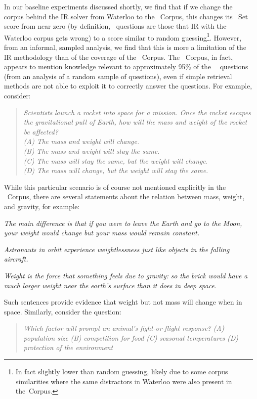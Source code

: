 In our baseline experiments discussed shortly, we find that if we change the corpus behind the
IR solver from Waterloo to the \ASC~Corpus, this changes its \Challenge~Set score from near zero (by definition,
\Challenge~questions are those that IR with the Waterloo corpus gets wrong) to a score similar to
random guessing\footnote{
  In fact slightly lower than random guessing, likely due to some corpus similarities where the
  same distractors in Waterloo were also present in the\ASC~Corpus.}.
However, from an informal, sampled analysis, we find that this is more
a limitation of the IR methodology than of the coverage of the \ASC~Corpus. The \ASC~Corpus,
in fact, appears to mention knowledge relevant to approximately 95\% of the \ASC~\Challenge~questions (from an
analysis of a random sample of questions), even if simple retrieval methods are not able to exploit it to correctly
answer the questions. For example, consider:
\begin{quote}
  {\it Scientists launch a rocket into space for a mission. Once the rocket escapes the gravitational pull of Earth, how will the mass and weight of the rocket be affected? \\
  (A) The mass and weight will change. \\
  (B) The mass and weight will stay the same.\\
  (C) The mass will stay the same, but the weight will change. \bfit{[correct]}\\
  (D) The mass will change, but the weight will stay the same.}
\end{quote}
While this particular scenario is of course not mentioned explicitly in the \ASC~Corpus, there are several statements about the relation between mass, weight, and gravity, for example:
\begin{ite}
\item {\it The main difference is that if you were to leave the Earth and go to the Moon, your weight would change but your mass would remain constant.}
\item {\it Astronauts in orbit experience weightlessness just like objects in the falling aircraft.}
\item {\it Weight is the force that something feels due to gravity: so the brick would have a much larger weight near the earth's surface than it does in deep space.}
\end{ite}
Such sentences provide evidence that weight but not mass will change when in space. Similarly, consider the question:
\begin{quote}
{\it Which factor will prompt an animal's fight-or-flight response? (A) population size (B) competition for food \bfit{[correct]} (C) seasonal temperatures (D) protection of the environment}
\end{quote}
